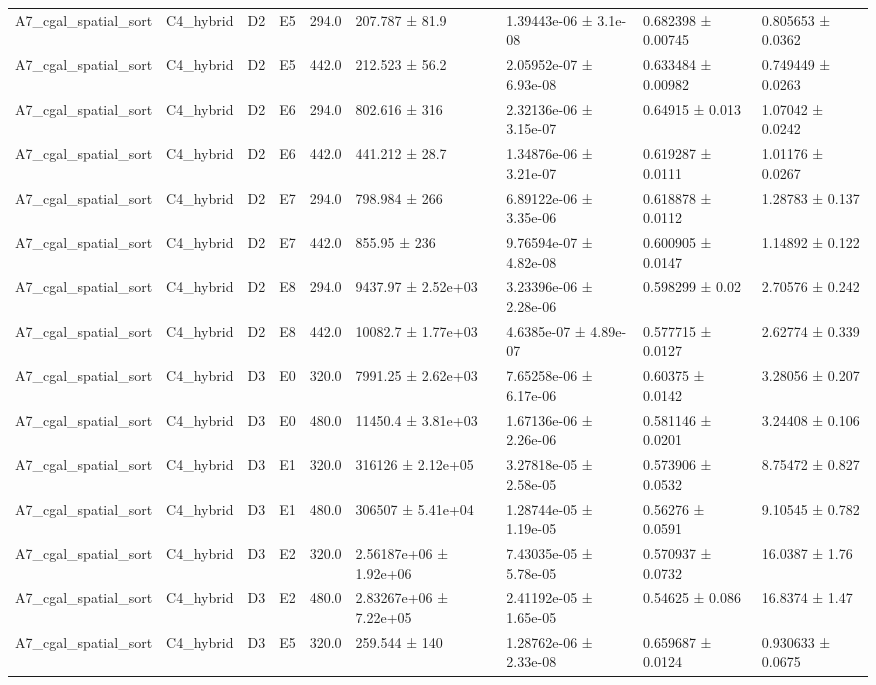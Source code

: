 \begin{table}
\begin{tabular}{lllllllll}
A7\_cgal\_spatial\_sort & C4\_hybrid & D2 & E5 & 294.0 & 207.787 ± 81.9 & 1.39443e-06 ± 3.1e-08 & 0.682398 ± 0.00745 & 0.805653 ± 0.0362 \\
A7\_cgal\_spatial\_sort & C4\_hybrid & D2 & E5 & 442.0 & 212.523 ± 56.2 & 2.05952e-07 ± 6.93e-08 & 0.633484 ± 0.00982 & 0.749449 ± 0.0263 \\
A7\_cgal\_spatial\_sort & C4\_hybrid & D2 & E6 & 294.0 & 802.616 ± 316 & 2.32136e-06 ± 3.15e-07 & 0.64915 ± 0.013 & 1.07042 ± 0.0242 \\
A7\_cgal\_spatial\_sort & C4\_hybrid & D2 & E6 & 442.0 & 441.212 ± 28.7 & 1.34876e-06 ± 3.21e-07 & 0.619287 ± 0.0111 & 1.01176 ± 0.0267 \\
A7\_cgal\_spatial\_sort & C4\_hybrid & D2 & E7 & 294.0 & 798.984 ± 266 & 6.89122e-06 ± 3.35e-06 & 0.618878 ± 0.0112 & 1.28783 ± 0.137 \\
A7\_cgal\_spatial\_sort & C4\_hybrid & D2 & E7 & 442.0 & 855.95 ± 236 & 9.76594e-07 ± 4.82e-08 & 0.600905 ± 0.0147 & 1.14892 ± 0.122 \\
A7\_cgal\_spatial\_sort & C4\_hybrid & D2 & E8 & 294.0 & 9437.97 ± 2.52e+03 & 3.23396e-06 ± 2.28e-06 & 0.598299 ± 0.02 & 2.70576 ± 0.242 \\
A7\_cgal\_spatial\_sort & C4\_hybrid & D2 & E8 & 442.0 & 10082.7 ± 1.77e+03 & 4.6385e-07 ± 4.89e-07 & 0.577715 ± 0.0127 & 2.62774 ± 0.339 \\
A7\_cgal\_spatial\_sort & C4\_hybrid & D3 & E0 & 320.0 & 7991.25 ± 2.62e+03 & 7.65258e-06 ± 6.17e-06 & 0.60375 ± 0.0142 & 3.28056 ± 0.207 \\
A7\_cgal\_spatial\_sort & C4\_hybrid & D3 & E0 & 480.0 & 11450.4 ± 3.81e+03 & 1.67136e-06 ± 2.26e-06 & 0.581146 ± 0.0201 & 3.24408 ± 0.106 \\
A7\_cgal\_spatial\_sort & C4\_hybrid & D3 & E1 & 320.0 & 316126 ± 2.12e+05 & 3.27818e-05 ± 2.58e-05 & 0.573906 ± 0.0532 & 8.75472 ± 0.827 \\
A7\_cgal\_spatial\_sort & C4\_hybrid & D3 & E1 & 480.0 & 306507 ± 5.41e+04 & 1.28744e-05 ± 1.19e-05 & 0.56276 ± 0.0591 & 9.10545 ± 0.782 \\
A7\_cgal\_spatial\_sort & C4\_hybrid & D3 & E2 & 320.0 & 2.56187e+06 ± 1.92e+06 & 7.43035e-05 ± 5.78e-05 & 0.570937 ± 0.0732 & 16.0387 ± 1.76 \\
A7\_cgal\_spatial\_sort & C4\_hybrid & D3 & E2 & 480.0 & 2.83267e+06 ± 7.22e+05 & 2.41192e-05 ± 1.65e-05 & 0.54625 ± 0.086 & 16.8374 ± 1.47 \\
A7\_cgal\_spatial\_sort & C4\_hybrid & D3 & E5 & 320.0 & 259.544 ± 140 & 1.28762e-06 ± 2.33e-08 & 0.659687 ± 0.0124 & 0.930633 ± 0.0675 \\

\end{tabular}
\end{table}
